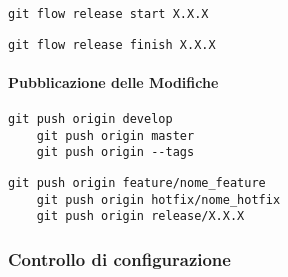     \begin{lstlisting}[style=code]
    git flow release start X.X.X
    \end{lstlisting}
    
    
    \begin{lstlisting}[style=code]
    git flow release finish X.X.X
    \end{lstlisting}
    
    \paragraph*{Pubblicazione delle Modifiche}
    
    \begin{lstlisting}[style=code]
    git push origin develop
    git push origin master
    git push origin --tags
    \end{lstlisting}
    
    \begin{lstlisting}[style=code]
    git push origin feature/nome_feature
    git push origin hotfix/nome_hotfix
    git push origin release/X.X.X
    \end{lstlisting}
\subsubsection{Controllo di configurazione}
